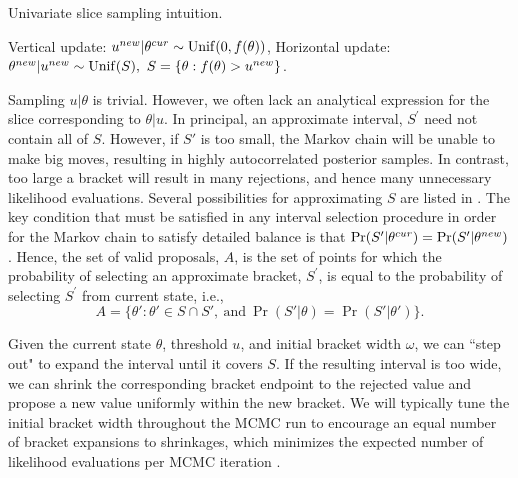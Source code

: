 \begin{algorithm}[htbp]
	\caption{Univariate slice sampling intuition.}\label{alg:univar_slice_intuition}
	\begin{algorithmic}[1]
		\State Vertical update: $ u^{new}|\theta^{cur} \sim \mathrm{Unif}(0,f(\theta))$,
		\State Horizontal update: $ \theta^{new}|u^{new} \sim \mathrm{Unif}(S),\ S = \lbrace \theta: f(\theta) > u^{new}\rbrace$.
		\EndProcedure
	\end{algorithmic}
\end{algorithm}

Sampling $ u|\theta $ is trivial. However, we often lack an analytical expression for the slice corresponding to $ \theta|u $. In principal, an approximate interval, $ S^\prime $ need not contain all of $ S $. However, if $ S' $ is too small, the Markov chain will be unable to make big moves, resulting in highly autocorrelated posterior samples. In contrast, too large a bracket will result in many rejections, and hence many unnecessary likelihood evaluations. Several possibilities for approximating $ S $ are listed in \cite{neal2003slice}. The key condition that must be satisfied in any interval selection procedure in order for the Markov chain to satisfy detailed balance is that $ \Pr(S'|\theta^{cur}) = \Pr(S'|\theta^{new}) $. Hence, the set of valid proposals, $ A $, is the set of points for which the probability of selecting an approximate bracket, $ S^\prime $, is equal to the probability of selecting $ S^\prime $ from current state, i.e., \[ A = \lbrace \theta': \theta' \in S\cap S',\ \mathrm{and}\ \Pr(S'|\theta) = \Pr(S'|\theta')\rbrace. \]

Given the current state $ \theta $, threshold $ u $, and initial bracket width $ \omega $, we can ``step out" to expand the interval until it covers $ S $. If the resulting interval is too wide, we can shrink the corresponding bracket endpoint to the rejected value and propose a new value uniformly within the new bracket. We will typically tune the initial bracket width throughout the MCMC run to encourage an equal number of bracket expansions to shrinkages, which minimizes the expected number of likelihood evaluations per MCMC iteration \cite{tibbits2014automated}.

